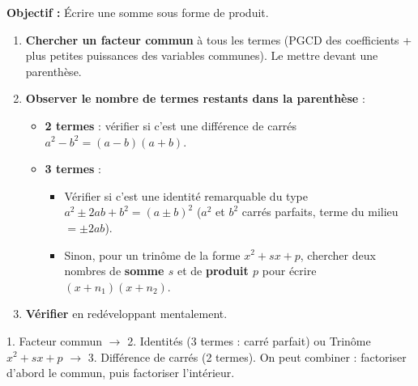 \documentclass[11pt]{article}
\begin{document}
\begin{methode}
    \textbf{Objectif :} Écrire une somme sous forme de produit.
    \begin{enumerate}
        \item \textbf{Chercher un facteur commun} à tous les termes (PGCD des coefficients + plus petites puissances des variables communes). Le mettre devant une parenthèse.
        \item \textbf{Observer le nombre de termes restants dans la parenthèse} :
            \begin{itemize}
                \item \textbf{2 termes} : vérifier si c'est une différence de carrés $a^2 - b^2 = (a-b)(a+b)$.
                \item \textbf{3 termes} :
                      \begin{itemize}
                          \item Vérifier si c'est une identité remarquable du type $a^2 \pm 2ab + b^2 = (a \pm b)^2$ ($a^2$ et $b^2$ carrés parfaits, terme du milieu $= \pm 2ab$).
                          \item Sinon, pour un trinôme de la forme $x^2 + sx + p$, chercher deux nombres de \textbf{somme $s$} et de \textbf{produit $p$} pour écrire $(x + n_1)(x + n_2)$.
                      \end{itemize}
            \end{itemize}
        \item \textbf{Vérifier} en redéveloppant mentalement.
    \end{enumerate}
    \begin{aretenir} 1. Facteur commun $\rightarrow$ 2. Identités (3 termes : carré parfait) ou Trinôme $x^2+sx+p$ $\rightarrow$ 3. Différence de carrés (2 termes). On peut combiner : factoriser d'abord le commun, puis factoriser l'intérieur.
    \end{aretenir}
\end{methode}
\end{document}
